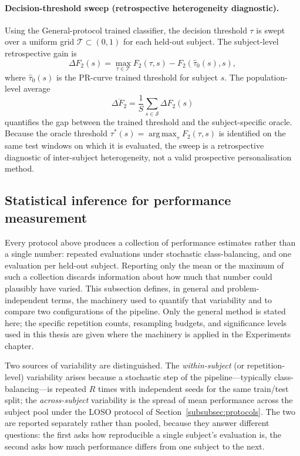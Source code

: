 \documentclass[onluarkali,ingilizce,yukseklisans,karton,LisansustuEgitim]{itutez}
\DeclareMathOperator*{\argmax}{arg\,max}
\providecommand{\1}{\mathbf{1}}
\providecommand{\Sset}{\mathcal{S}}
\begin{document}
\paragraph{Decision-threshold sweep (retrospective heterogeneity diagnostic).}
Using the General-protocol trained classifier, the decision threshold $\tau$ is swept over a uniform grid $\mathcal{T}\subset(0,1)$ for each held-out subject. The subject-level retrospective gain is
\begin{equation}
  \Delta F_2(s)=\max_{\tau\in\mathcal{T}}F_2(\tau,s)-F_2(\hat\tau_0(s),s),
  \label{eq:dF2}
\end{equation}
where $\hat\tau_0(s)$ is the PR-curve trained threshold for subject $s$. The population-level average
\[
  \overline{\Delta F_2}=\frac{1}{S}\sum_{s\in\Sset}\Delta F_2(s)
\]
quantifies the gap between the trained threshold and the subject-specific oracle. Because the oracle threshold $\tau^*(s)=\argmax_\tau F_2(\tau,s)$ is identified on the same test windows on which it is evaluated, the sweep is a retrospective diagnostic of inter-subject heterogeneity, not a valid prospective personalisation method.

\subsection{Statistical inference for performance measurement}
\label{subsubsec:stat-inference}

Every protocol above produces a collection of performance estimates rather than a single number: repeated evaluations under stochastic class-balancing, and one evaluation per held-out subject. Reporting only the mean or the maximum of such a collection discards information about how much that number could plausibly have varied. This subsection defines, in general and problem-independent terms, the machinery used to quantify that variability and to compare two configurations of the pipeline. Only the general method is stated here; the specific repetition counts, resampling budgets, and significance levels used in this thesis are given where the machinery is applied in the Experiments chapter.

Two sources of variability are distinguished. The \emph{within-subject} (or repetition-level) variability arises because a stochastic step of the pipeline---typically class-balancing---is repeated $R$ times with independent seeds for the same train/test split; the \emph{across-subject} variability is the spread of mean performance across the subject pool under the LOSO protocol of Section~\ref{subsubsec:protocols}. The two are reported separately rather than pooled, because they answer different questions: the first asks how reproducible a single subject's evaluation is, the second asks how much performance differs from one subject to the next.
\end{document}
